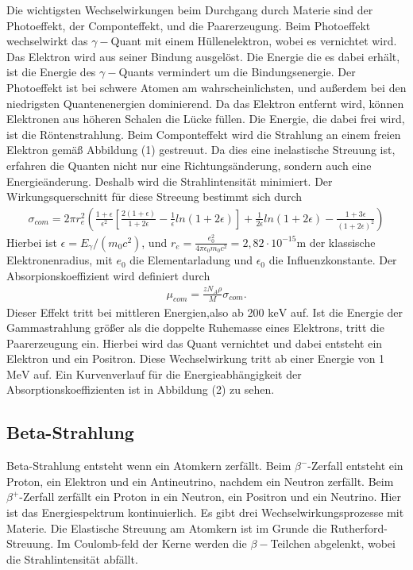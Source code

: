 Die wichtigsten Wechselwirkungen beim Durchgang durch Materie sind der Photoeffekt, der Componteffekt, und die Paarerzeugung.
Beim Photoeffekt wechselwirkt das $\gamma -$Quant mit einem Hüllenelektron, wobei es vernichtet wird. Das Elektron wird aus seiner Bindung ausgelöst.
Die Energie die es dabei erhält, ist die Energie des $\gamma -$Quants vermindert um die Bindungsenergie.
Der Photoeffekt ist bei schwere Atomen am wahrscheinlichsten, und außerdem bei den niedrigsten Quantenenergien dominierend.
Da das Elektron entfernt wird, können Elektronen aus höheren Schalen die Lücke füllen. Die Energie, die dabei frei wird, ist die Röntenstrahlung.
Beim Componteffekt wird die Strahlung an einem freien Elektron gemäß Abbildung (1) gestreuut. Da dies eine inelastische Streuung ist, erfahren die Quanten nicht nur eine Richtungsänderung, sondern auch eine Energieänderung. 
Deshalb wird die Strahlintensität minimiert. Der Wirkungsquerschnitt für diese Streeung bestimmt sich durch
\begin{align}
  \sigma_{com} = 2 \pi r_e^2 \left(\frac{1+\epsilon}{\epsilon^2} \left[\frac{2(1+\epsilon)}{1+2\epsilon}-\frac{1}{\epsilon} ln(1+2\epsilon) \right]
                + \frac{1}{2\epsilon} ln(1+2\epsilon) - \frac{1+3\epsilon}{(1+2\epsilon)^2} \right)
\end{align}
Hierbei ist  $\epsilon = E_{\gamma}/(m_0 c^2)$, und $r_e = \frac{e_0^2}{4 \pi \epsilon_0 m_0 c^2} = 2,82 \cdot 10^{-15}$m der klassische Elektronenradius, mit $e_0$ die Elementarladung und $\epsilon_0$ die Influenzkonstante.
Der Absorpionskoeffizient wird definiert durch
\begin{align}
  \mu_{com} =\frac{z N_A \rho}{M} \sigma_{com}.
\end{align}
Dieser Effekt tritt bei mittleren Energien,also ab 200 $\si{\keV}$ auf.
Ist die Energie der Gammastrahlung größer als die doppelte Ruhemasse eines Elektrons, tritt die Paarerzeugung ein.
Hierbei wird das Quant vernichtet und dabei entsteht ein Elektron und ein Positron.
Diese Wechselwirkung tritt ab einer Energie von 1 $\si{\MeV}$ auf.
Ein Kurvenverlauf für die Energieabhängigkeit der Absorptionskoeffizienten ist in Abbildung (2) zu sehen.

\subsection{Beta-Strahlung}
Beta-Strahlung entsteht wenn ein Atomkern zerfällt. Beim $\beta^{-}$-Zerfall entsteht ein Proton, ein Elektron und ein Antineutrino, nachdem ein Neutron zerfällt.
Beim $\beta^{+}$-Zerfall zerfällt ein Proton in ein Neutron, ein Positron und ein Neutrino. 
Hier ist das Energiespektrum kontinuierlich.
Es gibt drei Wechselwirkungsprozesse mit Materie.
Die Elastische Streuung am Atomkern ist im Grunde die Rutherford-Streuung. Im Coulomb-feld der Kerne werden die $\beta-$Teilchen abgelenkt, wobei die Strahlintensität abfällt.

